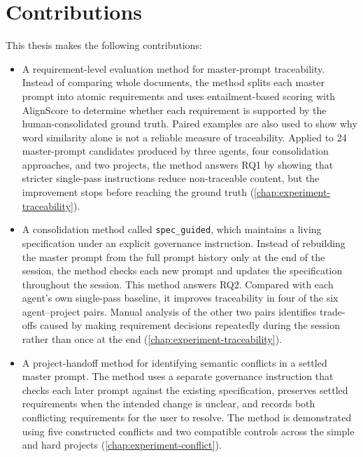 \section{Contributions}
\label{sec:contributions}

This thesis makes the following contributions:

\begin{itemize}[leftmargin=*]

\item A requirement-level evaluation method for master-prompt traceability.
Instead of comparing whole documents, the method splits each master prompt
into atomic requirements and uses entailment-based scoring with AlignScore
\citep{zha2023alignscore} to determine whether each requirement is supported
by the human-consolidated ground truth. Paired examples are also used to show
why word similarity alone is not a reliable measure of traceability. Applied
to 24 master-prompt candidates produced by three agents, four consolidation
approaches, and two projects, the method answers RQ1 by showing that stricter
single-pass instructions reduce non-traceable content, but the improvement
stops before reaching the ground truth
(\cref{chap:experiment-traceability}).

\item A consolidation method called \texttt{spec\_guided}, which maintains a
living specification under an explicit governance instruction. Instead of
rebuilding the master prompt from the full prompt history only at the end of
the session, the method checks each new prompt and updates the specification
throughout the session. This method answers RQ2. Compared with each agent's
own single-pass baseline, it improves traceability in four of the six
agent--project pairs. Manual analysis of the other two pairs identifies
trade-offs caused by making requirement decisions repeatedly during the
session rather than once at the end
(\cref{chap:experiment-traceability}).

\item A project-handoff method for identifying semantic conflicts in a settled
master prompt. The method uses a separate governance instruction that checks
each later prompt against the existing specification, preserves settled
requirements when the intended change is unclear, and records both conflicting
requirements for the user to resolve. The method is demonstrated using five
constructed conflicts and two compatible controls across the simple and hard
projects (\cref{chap:experiment-conflict}).

\end{itemize}

